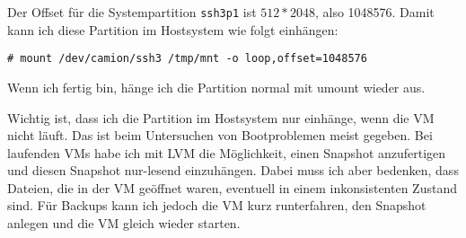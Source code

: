 Der Offset für die Systempartition \verb?ssh3p1? ist $512 * 2048$, also
1048576. Damit kann ich diese Partition im Hostsystem wie folgt einhängen:

\begin{verbatim}
# mount /dev/camion/ssh3 /tmp/mnt -o loop,offset=1048576
\end{verbatim}

Wenn ich fertig bin, hänge ich die Partition normal mit umount wieder aus.

Wichtig ist, dass ich die Partition im Hostsystem nur einhänge, wenn die VM
nicht läuft. Das ist beim Untersuchen von Bootproblemen meist gegeben. Bei
laufenden VMs habe ich mit LVM die Möglichkeit, einen Snapshot anzufertigen
und diesen Snapshot nur-lesend einzuhängen. Dabei muss ich aber bedenken, dass
Dateien, die in der VM geöffnet waren, eventuell in einem inkonsistenten
Zustand sind. Für Backups kann ich jedoch die VM kurz runterfahren, den
Snapshot anlegen und die VM gleich wieder starten.









